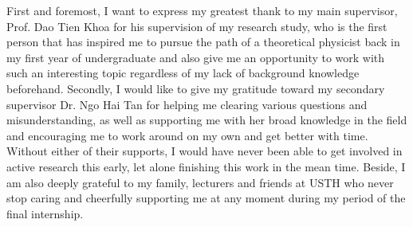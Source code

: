 First and foremost, I want to express my greatest thank to my main supervisor, Prof. Dao Tien Khoa for his supervision of my research study, who is the first person that has inspired me to pursue the path of a theoretical physicist back in my first year of undergraduate and also give me an opportunity to work with such an interesting topic regardless of my lack of background knowledge beforehand. Secondly, I would like to give my gratitude toward my secondary supervisor Dr. Ngo Hai Tan for helping me clearing various questions and misunderstanding, as well as supporting me with her broad knowledge in the field and encouraging me to work around on my own and get better with time. Without either of their supports, I would have never been able to get involved in active research this early, let alone finishing this work in the mean time. Beside, I am also deeply grateful to my family, lecturers and friends at USTH who never stop caring and cheerfully supporting me at any moment during my period of the final internship.
